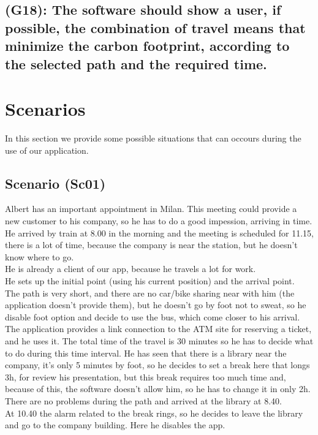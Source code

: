 \documentclass[a4paper,leqno]{book}
\begin{document}
\subsection {(G18): The software should show a user, if possible, the combination of travel means that minimize the carbon footprint, according to the selected path and the required time.}


\section{Scenarios}
In this section we provide some possible situations that can occours during the use of our application.

\subsection{Scenario (Sc01) }
Albert has an important appointment in Milan. 
This meeting could provide a new customer to his company, so he has to do a good impession, arriving in time.\\
He arrived by train at 8.00 in the morning and the meeting is scheduled for 11.15, there is a lot of time, because 
the company is near the station, but he doesn't know where to go.\\
He is already a client of our app, because he travels a lot for work.\\
He sets up the initial point (using his current position) and the arrival point.\\
The path is very short, and there are no car/bike sharing near with him (the application doesn't provide them), but he doesn't go by foot not to sweat,
so he disable foot option and decide to use the bus, which come closer to his arrival.\\
The application provides a link connection to the ATM site for reserving a ticket, and he uses it.
The total time of the travel is 30 minutes so he has to decide what to do during this time interval.
He has seen that there is a library near the company, it's only 5 minutes by foot, so he decides to set a break here that longs 3h, for review his presentation,
but this break requires too much time and, because of this, the software doesn't allow him, so he has to change it in only 2h.
There are no problems during the path and arrived at the library at 8.40.\\
At 10.40 the alarm related to the break rings, so he decides to leave the library and go to the company building. 
Here he disables the app.
\end{document}
